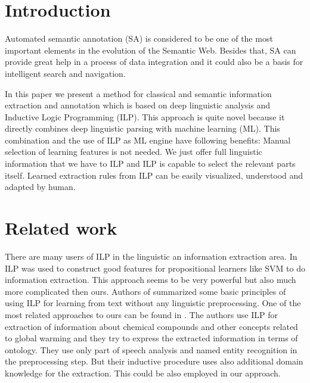 \documentclass[runningheads,a4paper]{llncs}
\begin{document}
\section{Introduction}
Automated semantic annotation (SA) is considered to be one of the most important elements in the evolution of the Semantic Web. Besides that, SA can provide great help in a process of data integration and it could also be a basis for intelligent search and navigation.

In this paper we present a method for classical and semantic information extraction and annotation which is based on deep linguistic analysis and Inductive Logic Programming (ILP). This approach is quite novel because it directly combines deep linguistic parsing with machine learning (ML). This combination and the use of ILP as ML engine have following benefits: Manual selection of learning features is not needed. We just offer full linguistic information that we have to ILP and ILP is capable to select the relevant parts itself. Learned extraction rules from ILP can be easily visualized, understood and adapted by human.




\section{Related work}
There are many users of ILP in the linguistic an information extraction area.
In \cite{Ramakrishnan:UsingILPforFeatures} ILP was used to construct good features for propositional learners like SVM to do information extraction. This approach seems to be very powerful but also much more complicated then ours. Authors of \cite{Junker99learningfor} summarized some basic principles of using ILP for learning from text without any linguistic preprocessing. One of the most related approaches to ours can be found in \cite{aitken02:_learn_infor_extrac_rules}. The authors use ILP for extraction of information about chemical compounds and other concepts related to global warming and they try to express the extracted information in terms of ontology. They use only part of speech analysis and named entity recognition in the preprocessing step. But their inductive procedure uses also additional domain knowledge for the extraction. This could be also employed in our approach.
\end{document}
